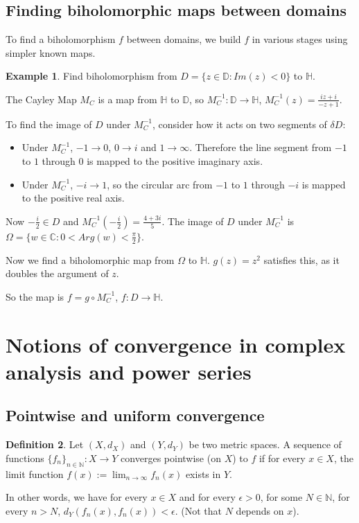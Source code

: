 \documentclass[12pt,a4paper]{article}
\theoremstyle{definition}
\newtheorem{definition}{Definition}[subsection]
\newtheorem{example}[definition]{Example}
\begin{document}
\subsection{Finding biholomorphic maps between domains}

To find a biholomorphism $f$ between domains, we build $f$ in various stages using simpler known maps.

\begin{example}
	Find biholomorphism from $D = \{z \in \mathbb{D}: Im(z) < 0\}$ to $\mathbb{H}$.

	The Cayley Map $M_C$ is a map from $\mathbb{H}$ to $\mathbb{D}$, so $M_C^{-1}: \mathbb{D} \rightarrow \mathbb{H}$, $M_C^{-1}(z) = \frac{iz + i}{-z + 1}$.

	To find the image of $D$ under $M_C^{-1}$, consider how it acts on two segments of $\delta D$:

	\begin{itemize}
		\item Under $M_C^{-1}$, $-1 \rightarrow 0$, $0 \rightarrow i$ and $1 \rightarrow \infty$. Therefore the line segment from $-1$ to $1$ through $0$ is mapped to the positive imaginary axis.
		\item Under $M_C^{-1}$, $-i \rightarrow 1$, so the circular arc from $-1$ to $1$ through $-i$ is mapped to the positive real axis.
	\end{itemize}

	Now $-\frac{i}{2} \in D$ and $M_C^{-1}(-\frac{i}{2}) = \frac{4 + 3i}{5}$. The image of $D$ under $M_C^{-1}$ is $\Omega = \{w \in \mathbb{C}: 0 < Arg(w) < \frac{\pi}{2}\}$.

	Now we find a biholomorphic map from $\Omega$ to $\mathbb{H}$. $g(z) = z^2$ satisfies this, as it doubles the argument of $z$.

	So the map is $f = g \circ M_C^{-1}$, $f: D \rightarrow \mathbb{H}$.
\end{example}

\section{Notions of convergence in complex analysis and power series}

\subsection{Pointwise and uniform convergence}

\begin{definition}
	Let $(X, d_X)$ and $(Y, d_Y)$ be two metric spaces. A sequence of functions ${\{f_n\}}_{n \in \mathbb{N}}: X \rightarrow Y$ converges pointwise (on $X$) to $f$ if for every $x \in X$, the limit function $f(x) := \lim_{n \rightarrow \infty} f_n(x)$ exists in $Y$.

	In other words, we have for every $x \in X$ and for every $\epsilon > 0$, for some $N \in \mathbb{N}$, for every $n > N$, $d_Y(f_n(x), f_n(x)) < \epsilon$. (Not that $N$ depends on $x$).
\end{definition}
\end{document}
